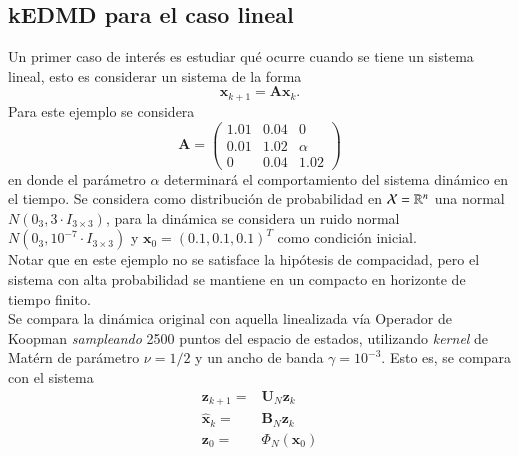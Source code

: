 \subsection{kEDMD para el caso lineal}

Un primer caso de interés es estudiar qué ocurre cuando se tiene un sistema lineal, esto es considerar un sistema de la forma
\begin{equation*}
    \mathbf{x}_{k+1} = \mathbf{A} \mathbf{x}_{k}.
\end{equation*}
Para este ejemplo se considera
\begin{equation*}
    \mathbf{A} = 
    \begin{pmatrix}
        1.01 & 0.04 & 0 \\
        0.01 & 1.02 & \alpha \\
        0 & 0.04 & 1.02
    \end{pmatrix}
\end{equation*}
en donde el parámetro $\alpha$ determinará el comportamiento del sistema dinámico en el tiempo. Se considera como distribución de probabilidad en $\mathcal{X} = \mathbb{R}^n$ una normal $N(0_{3}, 3 \cdot I_{3\times3})$, para la dinámica se considera un ruido normal $N(0_{3}, 10^{-7} \cdot I_{3\times3})$ y $\mathbf{x}_0 = (0.1, 0.1, 0.1)^T$ como condición inicial.\\
Notar que en este ejemplo no se satisface la hipótesis de compacidad, pero el sistema con alta probabilidad se mantiene en un compacto en horizonte de tiempo finito.\\
Se compara la dinámica original con aquella linealizada vía Operador de Koopman \textit{sampleando} 2500 puntos del espacio de estados, utilizando \textit{kernel} de Matérn de parámetro $\nu = 1/2$ y un ancho de banda $\gamma = 10^{-3}$. Esto es, se compara con el sistema
\begin{align*}
    \mathbf{z}_{k+1} = & \mathbf{U}_N \mathbf{z}_k \\
    \hat{\mathbf{x}}_k = & \mathbf{B}_N \mathbf{z}_k \\
    \mathbf{z}_0 = & \Phi_N(\mathbf{x}_0)
\end{align*}

